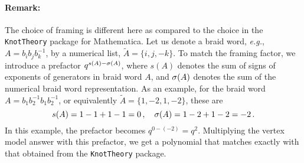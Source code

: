 \documentclass[11pt]{article}
\begin{document}
\paragraph{Remark:}
The choice of framing is different here as compared to the choice in the \texttt{KnotTheory} package for Mathematica.
Let us denote a braid word, \textit{e.g.}, $A=b_ib_jb_k^{-1}$,  by a numerical list, $\tilde A=\{i,j,-k\}$.
To match the framing factor, we introduce a prefactor \( q^{s(A)-\sigma(A)} \), where \( s(A) \) denotes the sum of signs of exponents of generators in braid word $A$, and \( \sigma(A) \) denotes the sum of the numerical braid word representation.
As an example, for the braid word \( A= b_1 b_2^{-1} b_1 b_2^{-1} \), or equivalently \(\tilde A= \{1, -2, 1, -2\} \), these are
\begin{equation}
s(A) = 1 - 1 + 1 - 1 = 0 \,, \quad \sigma(A) = 1 - 2 + 1 - 2 = -2 \,.
\end{equation}
In this example, the prefactor becomes \( q^{0 - (-2)} = q^2 \). Multiplying the vertex model answer with this prefactor, we get a polynomial that matches exactly with that obtained from the \texttt{KnotTheory} package.



\end{document}
